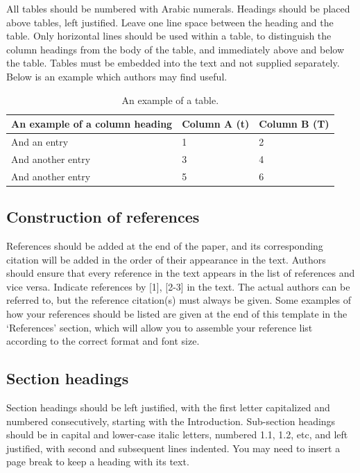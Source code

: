 \documentclass[3p,times,procedia]{elsarticle}
\begin{document}
All tables should be numbered with Arabic numerals. Headings should be placed above tables, left justified. Leave one line space between the heading and the table. Only horizontal lines should be used within a table, to distinguish the column headings from the body of the table, and immediately above and below the table. Tables must be embedded into the text and not supplied separately. Below is an example which authors may find useful.

\begin{table}[h]
\caption{An example of a table.}
\begin{tabular*}{\hsize}{@{\extracolsep{\fill}}lll@{}}
\hline
An example of a column heading & Column A (t) & Column B (T)\\
\hline
And an entry &   1 &  2\\
And another entry  & 3 &  4\\
And another entry &  5 &  6\\
\hline
\end{tabular*}
\end{table}


\subsection{ Construction of references}

References should be added at the end of the paper, and its corresponding citation will be added in the order of their appearance in the text. Authors should ensure that every reference in the text appears in the list of references and vice versa. Indicate references by [1], [2-3] in the text. The actual authors can be referred to, but the reference citation(s) must always be given. Some examples of how your references should be listed are given at the end of this template in the `References' section, which will allow you to assemble your reference list according to the correct format and font size.

\subsection{Section headings}
Section headings should be left justified, with the first letter capitalized and numbered consecutively, starting with the Introduction. Sub-section headings should be in capital and lower-case italic letters, numbered 1.1, 1.2, etc, and left justified, with second and subsequent lines indented. You may need to insert a page break to keep a heading with its text.
\end{document}
